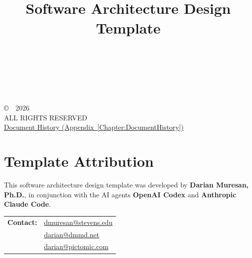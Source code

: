 \title{\ProjectName\\[0.5em]\large Software Architecture Design Template\\[1.5em]\normalsize\VERSION\\\DocumentStatus}
\author{\DocumentOwner\\\Organization}
\conferraldate{}{\DocumentDate}
\copyrightholder{\Organization}
\maketitle

\begin{copyrightpage}
\copyright\ \Organization\ 2026 \\
ALL RIGHTS RESERVED \\[0.2in]
\hyperref[Chapter:DocumentHistory]{Document History (Appendix~\ref*{Chapter:DocumentHistory})}
\end{copyrightpage}

\cleardoublepage
{}
\chapter*{Template Attribution}

This software architecture design template was developed by
\textbf{Darian Muresan, Ph.D.}, in conjunction with the AI agents
\textbf{OpenAI Codex} and \textbf{Anthropic Claude Code}.

\begin{tabularx}{\linewidth}{@{}L{3.0cm}Y@{}}
\textbf{Contact:} & \href{mailto:dmuresan@stevens.edu}{dmuresan@stevens.edu}\\
& \href{mailto:darian@dmmd.net}{darian@dmmd.net}\\
& \href{mailto:darian@pictomic.com}{darian@pictomic.com}
\end{tabularx}

\clearpage
\begin{abstract}
  
\end{abstract}

\contentspage
\tablelistpage
\figurelistpage
